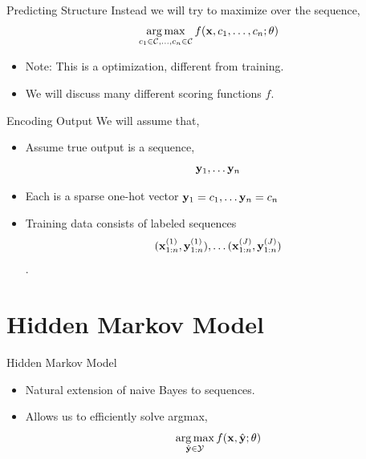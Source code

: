 \documentclass{beamer}
\begin{document}
\begin{frame}{Predicting Structure}
  Instead we will try to maximize over the sequence,
  \[ \argmax_{c_1 \in \mcC, \ldots, c_n\in \mcC} f(\boldx, c_1, \ldots, c_n; \theta)\]

  \begin{itemize}
  \item Note: This is a  optimization, different from training.
    \air

  \item We will discuss many different scoring functions $f$.
  \end{itemize}
\end{frame}


\begin{frame}{Encoding Output}
  We will assume that,
  \begin{itemize}
  \item Assume true output is a sequence,
    \[ \mathbf{y}_1, \ldots \mathbf{y}_n\] 

  \item Each is a sparse one-hot vector $\mathbf{y}_1 = c_1, \ldots \mathbf{y}_n = c_n$ 
    \air 

  \item Training data consists of labeled sequences
    \[(\mathbf{x}_{1:n}^{(1)}, \mathbf{y}_{1:n}^{(1)}), \ldots (\mathbf{x}_{1:n}^{(J)}, \mathbf{y}_{1:n}^{(J)})\].
  \end{itemize}
\end{frame}

\section{Hidden Markov Model}

\begin{frame}{Hidden Markov Model}
  \begin{itemize}
  \item Natural extension of naive Bayes to sequences.
    \air 
  \item Allows us to efficiently solve argmax,
    \[ \argmax_{\hat{\boldy} \in \mcY} f(\boldx, \hat{\boldy}; \theta)\]
  \end{itemize}
\end{frame}
\end{document}
